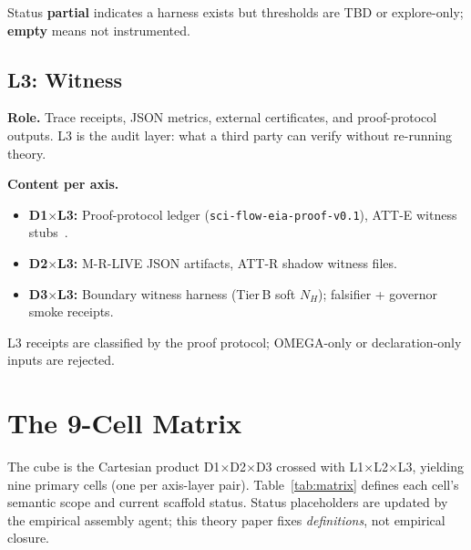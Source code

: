 \documentclass[11pt,a4paper]{article}
\theoremstyle{definition}
\begin{document}
Status \textbf{partial} indicates a harness exists but thresholds are TBD or explore-only; \textbf{empty} means not instrumented.

\subsection{L3: Witness}

\textbf{Role.} Trace receipts, JSON metrics, external certificates, and proof-protocol outputs. L3 is the audit layer: what a third party can verify without re-running theory.

\textbf{Content per axis.}
\begin{itemize}[leftmargin=*]
\item \textbf{D1$\times$L3:} Proof-protocol ledger (\texttt{sci-flow-eia-proof-v0.1}), ATT-E witness stubs~\cite{kuznetsov2026proof}.
\item \textbf{D2$\times$L3:} M-R-LIVE JSON artifacts, ATT-R shadow witness files.
\item \textbf{D3$\times$L3:} Boundary witness harness (Tier\,B soft $N_H$); falsifier + governor smoke receipts.
\end{itemize}

L3 receipts are classified by the proof protocol; OMEGA-only or declaration-only inputs are rejected.

\section{The 9-Cell Matrix}\label{sec:matrix}

The cube is the Cartesian product D1$\times$D2$\times$D3 crossed with L1$\times$L2$\times$L3, yielding nine primary cells (one per axis-layer pair). Table~\ref{tab:matrix} defines each cell's semantic scope and current scaffold status. Status placeholders are updated by the empirical assembly agent; this theory paper fixes \emph{definitions}, not empirical closure.
\end{document}
